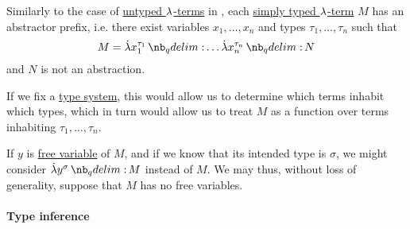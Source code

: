 \begin{remark}\label{rem:simply_typed_lambda_term_dependency}
  Similarly to the case of \hyperref[def:lambda_term]{untyped \( {\mathrm \lambda} \)-terms} in , each \hyperref[def:typed_lambda_term]{simply typed \( {\mathrm \lambda} \)-term} \( M \) has an abstractor prefix, i.e. there exist variables \( x_1, \ldots, x_n \) and types \( \tau_1, \ldots, \tau_n \) such that
  \begin{equation*}
    M = \qabs {x_1^{\tau_1}}\ldots \qabs {x_n^{\tau_n}} N
  \end{equation*}
  and \( N \) is not an abstraction.

  If we fix a \hyperref[def:abstract_type_system]{type system}, this would allow us to determine which terms inhabit which types, which in turn would allow us to treat \( M \) as a function over terms inhabiting \( \tau_1, \ldots, \tau_n \).

  If \( y \) is \hyperref[def:lambda_variable_freeness]{free variable} of \( M \), and if we know that its intended type is \( \sigma \), we might consider \( \qabs {y^\sigma} M \) instead of \( M \). We may thus, without loss of generality, suppose that \( M \) has no free variables.
\end{remark}

\paragraph{Type inference}

